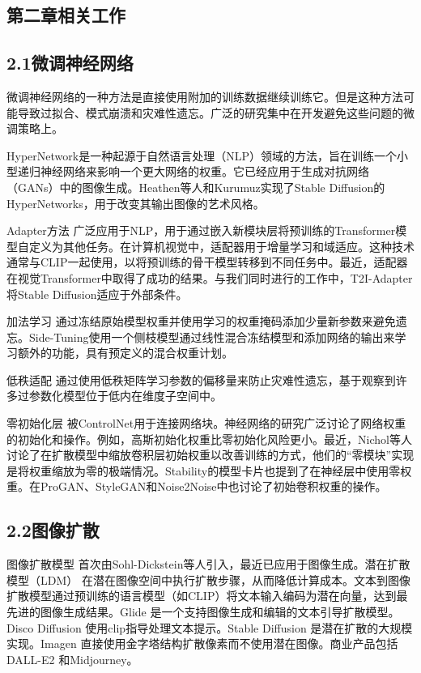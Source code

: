 \documentclass[a4paper,AutoFakeBold,oneside,12pt]{book}
\begin{document}
\begin{nopagenumber}
\chapter*{第二章\quad{}相关工作}
\newtranschapter

\section*{2.1\quad{}微调神经网络}
微调神经网络的一种方法是直接使用附加的训练数据继续训练它。但是这种方法可能导致过拟合、模式崩溃和灾难性遗忘。广泛的研究集中在开发避免这些问题的微调策略上。

HyperNetwork是一种起源于自然语言处理（NLP）领域的方法，旨在训练一个小型递归神经网络来影响一个更大网络的权重。它已经应用于生成对抗网络（GANs）中的图像生成。Heathen等人和Kurumuz实现了Stable Diffusion的HyperNetworks，用于改变其输出图像的艺术风格。

Adapter方法 广泛应用于NLP，用于通过嵌入新模块层将预训练的Transformer模型自定义为其他任务。在计算机视觉中，适配器用于增量学习和域适应。这种技术通常与CLIP一起使用，以将预训练的骨干模型转移到不同任务中。最近，适配器在视觉Transformer中取得了成功的结果。与我们同时进行的工作中，T2I-Adapter将Stable Diffusion适应于外部条件。

加法学习 通过冻结原始模型权重并使用学习的权重掩码添加少量新参数来避免遗忘。Side-Tuning使用一个侧枝模型通过线性混合冻结模型和添加网络的输出来学习额外的功能，具有预定义的混合权重计划。

低秩适配 通过使用低秩矩阵学习参数的偏移量来防止灾难性遗忘，基于观察到许多过参数化模型位于低内在维度子空间中。

零初始化层 被ControlNet用于连接网络块。神经网络的研究广泛讨论了网络权重的初始化和操作。例如，高斯初始化权重比零初始化风险更小。最近，Nichol等人讨论了在扩散模型中缩放卷积层初始权重以改善训练的方式，他们的“零模块”实现是将权重缩放为零的极端情况。Stability的模型卡片也提到了在神经层中使用零权重。在ProGAN、StyleGAN和Noise2Noise中也讨论了初始卷积权重的操作。

\section*{2.2\quad{}图像扩散}
图像扩散模型 首次由Sohl-Dickstein等人引入，最近已应用于图像生成。潜在扩散模型（LDM） 在潜在图像空间中执行扩散步骤，从而降低计算成本。文本到图像扩散模型通过预训练的语言模型（如CLIP）将文本输入编码为潜在向量，达到最先进的图像生成结果。Glide 是一个支持图像生成和编辑的文本引导扩散模型。Disco Diffusion 使用clip指导处理文本提示。Stable Diffusion 是潜在扩散的大规模实现。Imagen 直接使用金字塔结构扩散像素而不使用潜在图像。商业产品包括DALL-E2 和Midjourney。


\end{nopagenumber}
\end{document}
